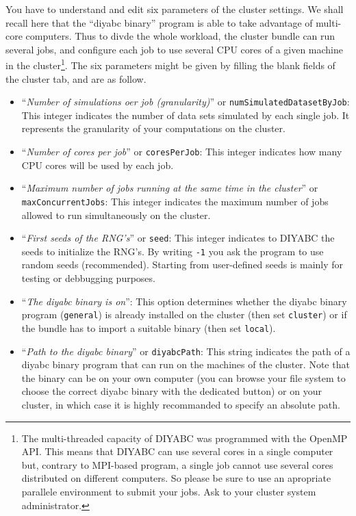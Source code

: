 You have to understand and edit six parameters of the cluster settings. We shall recall here that the ``diyabc binary'' program is able to take advantage of multi-core computers. Thus to divde the whole workload, the cluster bundle can run several jobs, and configure each job to use several CPU cores of a given machine in the cluster\footnote{The multi-threaded capacity of DIYABC was programmed with the OpenMP API. This means that DIYABC can use several cores in a single computer but, contrary to MPI-based program, a single job cannot use several cores distributed on different computers. So please be sure to use an apropriate parallele environment to submit your jobs. Ask to your cluster system administrator.}. 
The six parameters might be given by filling the blank fields of the cluster tab, and are as follow.
\begin{itemize}\setlength{\itemsep}{0pt} \setlength{\topsep}{0pt} \setlength{\partopsep}{0pt} \setlength{\parsep}{0pt}  \setlength{\parskip}{0pt}%
\item ``\textit{Number of simulations oer job (granularity)}'' or \texttt{numSimulatedDatasetByJob}: This integer indicates the number of data sets simulated by each single job. It represents the granularity of your computations on the cluster.
\item ``\textit{Number of cores per job}'' or \texttt{coresPerJob}: This integer indicates how many CPU cores will be used by each job.
\item ``\textit{Maximum number of jobs running at the same time in the cluster}'' or \texttt{maxConcurrentJobs}: This integer indicates the maximum number of jobs allowed to run simultaneously on the cluster.
\item ``\textit{First seeds of the RNG's}'' or \texttt{seed}: This integer indicates to DIYABC the seeds to initialize the RNG's. By writing \texttt{-1} you ask the program to use random seeds (recommended). Starting from user-defined seeds is mainly for testing or debbugging purposes. 
\item ``\textit{The diyabc binary is on}'': This option determines whether the diyabc binary program (\texttt{general}) is already installed on the cluster (then set \texttt{cluster}) or if the bundle has to import a suitable binary (then set \texttt{local}).
\item ``\textit{Path to the diyabc binary}'' or \texttt{diyabcPath}: This string indicates the path of a diyabc binary program that can run on the machines of the cluster. Note that the binary can be on your own computer (you can browse your file system to choose the correct diyabc binary with the dedicated button) or on your cluster, in which case it is highly recommanded to specify an absolute path. 
\end{itemize}



